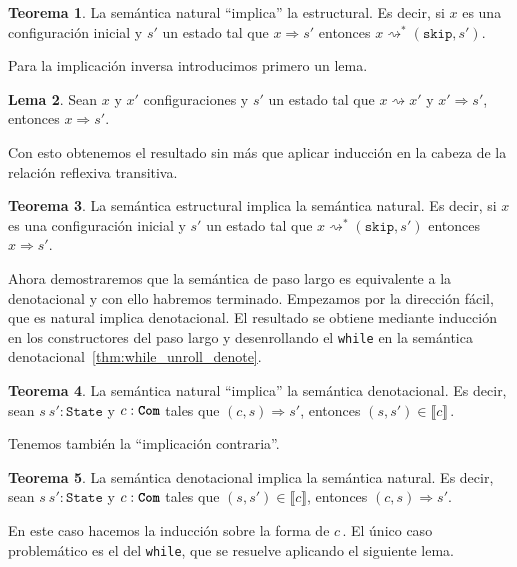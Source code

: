 \documentclass[
  a4paper, 
  10pt, 
  parskip=half, 
  toc=bibliography,
]{scrbook}
\theoremstyle{definition}
\theoremstyle{bolddef}
\newtheorem{theorem}{Teorema}[section]
\newtheorem{lemma}[theorem]{Lema}
\newcommand{\funfont}[1]{\texttt{#1}}
\newcommand{\tyfont}[1]{\texttt{\textbf{#1}}}
\newcommand{\ImpSkip}{\texttt{skip}}
\newcommand{\bigstep}{\Longrightarrow}
\newcommand{\Denote}[1]{\llbracket{} {#1} \rrbracket{}}
\begin{document}
\begin{theorem}
  La semántica natural \enquote{implica} la estructural. Es decir, si
  \(x\) es una configuración inicial y \(s'\) un estado tal que
  \(x \bigstep s'\) entonces \(x \rightsquigarrow^* (\ImpSkip, s')\).
\end{theorem}

Para la implicación inversa introducimos primero un lema.

\begin{lemma}
  Sean \(x\) y \(x'\) configuraciones y \(s'\) un estado tal que
  \(x \rightsquigarrow x'\) y \(x' \bigstep s'\), entonces
  \(x \bigstep s'\).
\end{lemma}

Con esto obtenemos el resultado sin más que aplicar inducción en la cabeza de la
relación reflexiva transitiva.

\begin{theorem}
  La semántica estructural implica la semántica natural. Es decir, si
  \(x\) es una configuración inicial y \(s'\) un estado tal que
  \(x \rightsquigarrow^* (\ImpSkip, s')\) entonces \(x \bigstep s'\).
\end{theorem}

Ahora demostraremos que la semántica de paso largo es equivalente a la
denotacional y con ello habremos terminado. Empezamos por la dirección fácil,
que es natural implica denotacional. El resultado se obtiene mediante inducción
en los constructores del paso largo y desenrollando el \texttt{while} en la
semántica denotacional~\ref{thm:while_unroll_denote}.

\begin{theorem}
  La semántica natural \enquote{implica} la semántica denotacional. Es decir, sean
  \(s \ s': \funfont{State}\) y \(c: \tyfont{Com}\) tales que
  \((c, s) \bigstep s'\), entonces \((s, s') \in \Denote{c}\,\).
\end{theorem}

Tenemos también la \enquote{implicación contraria}.

\begin{theorem}
  La semántica denotacional implica la semántica natural. Es decir, sean
  \(s \ s': \funfont{State}\) y \(c: \tyfont{Com}\) tales que
  \((s, s') \in \Denote{c}\), entonces \((c, s) \bigstep s'\).
\end{theorem}

En este caso hacemos la inducción sobre la forma de \(c\,\). El único caso
problemático es el del \texttt{while}, que se resuelve aplicando el
siguiente lema.
\end{document}
